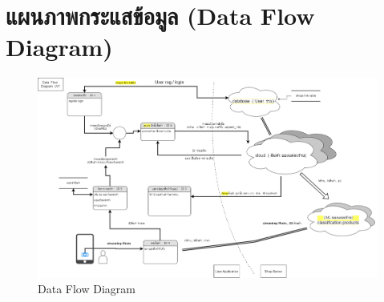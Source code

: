 \section{แผนภาพกระแสข้อมูล (Data Flow Diagram)}
\begin{figure}[h]
  \begin{center}
  \includegraphics[scale=0.25]{pic/dataflow-lv0.png}
  \end{center}
  
  \caption[Data Flow Diagram]{Data Flow Diagram}
  \label{fig:Data Flow Diagram}
  \end{figure}
  










